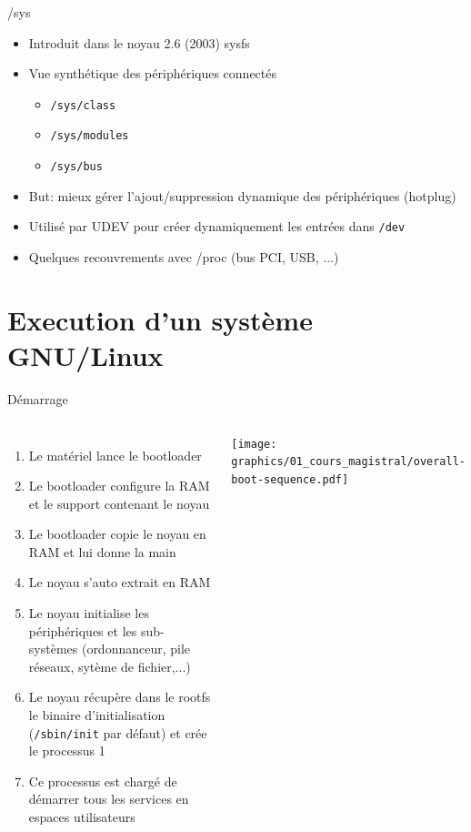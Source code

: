 \begin{frame}{/sys}
  \begin{itemize}
  \item Introduit dans le noyau 2.6 (2003) \MVRightarrow{} sysfs
  \item Vue synthétique des périphériques connectés
    \begin{itemize}
    \item \texttt{/sys/class}
    \item \texttt{/sys/modules}
    \item \texttt{/sys/bus}
    \end{itemize}
  \item But: mieux gérer l'ajout/suppression dynamique des périphériques (hotplug)
  \item Utilisé par UDEV pour créer dynamiquement les entrées dans \texttt{/dev}
  \item Quelques recouvrements avec /proc (bus PCI, USB, ...)
  \end{itemize}
\end{frame}

\section{Execution d'un système GNU/Linux}

\begin{frame}{Démarrage}
  \begin{columns}
    \begin{enumerate}
    \item Le matériel lance le bootloader
    \item Le bootloader configure la RAM et le support contenant le noyau
    \item Le bootloader copie le noyau en RAM et lui donne la main
    \item Le noyau s'auto extrait en RAM
    \item Le noyau initialise les périphériques et les sub-systèmes (ordonnanceur, pile réseaux, sytème de fichier,...)
    \item Le noyau récupère dans le rootfs le binaire d'initialisation (\texttt{/sbin/init} par défaut) et crée le processus 1
    \item Ce processus est chargé de démarrer tous les services en espaces utilisateurs
    \end{enumerate}
    \begin{center}
      \texttt{[image: graphics/01\_cours\_magistral/overall-boot-sequence.pdf]}
    \end{center}
  \end{columns}
\end{frame}

